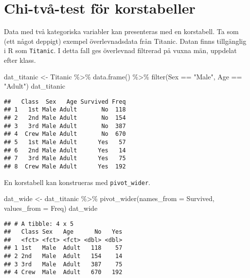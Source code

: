 \documentclass[
]{book}
\newenvironment{Shaded}{\begin{snugshade}}{\end{snugshade}}
\newcommand{\AttributeTok}[1]{\textcolor[rgb]{0.77,0.63,0.00}{#1}}
\newcommand{\FunctionTok}[1]{\textcolor[rgb]{0.00,0.00,0.00}{#1}}
\newcommand{\NormalTok}[1]{#1}
\newcommand{\OtherTok}[1]{\textcolor[rgb]{0.56,0.35,0.01}{#1}}
\newcommand{\SpecialCharTok}[1]{\textcolor[rgb]{0.00,0.00,0.00}{#1}}
\newcommand{\StringTok}[1]{\textcolor[rgb]{0.31,0.60,0.02}{#1}}
\theoremstyle{definition}
\theoremstyle{definition}
\theoremstyle{definition}
\theoremstyle{definition}
\theoremstyle{remark}
\begin{document}
\hypertarget{chi-tvuxe5-test-fuxf6r-korstabeller}{%
\section{Chi-två-test för korstabeller}\label{chi-tvuxe5-test-fuxf6r-korstabeller}}

Data med två kategoriska variabler kan presenteras med en korstabell. Ta som (ett något deppigt) exempel överlevnadsdata från Titanic. Datan finns tillgänglig i R som \texttt{Titanic}. I detta fall ges överlevnad filtrerad på vuxna män, uppdelat efter klass.

\begin{Shaded}
\begin{Highlighting}[]
\NormalTok{dat\_titanic }\OtherTok{\textless{}{-}}\NormalTok{ Titanic }\SpecialCharTok{\%\textgreater{}\%} \FunctionTok{data.frame}\NormalTok{() }\SpecialCharTok{\%\textgreater{}\%} \FunctionTok{filter}\NormalTok{(Sex }\SpecialCharTok{==} \StringTok{"Male"}\NormalTok{, Age }\SpecialCharTok{==} \StringTok{"Adult"}\NormalTok{)}
\NormalTok{dat\_titanic}
\end{Highlighting}
\end{Shaded}

\begin{verbatim}
##   Class  Sex   Age Survived Freq
## 1   1st Male Adult       No  118
## 2   2nd Male Adult       No  154
## 3   3rd Male Adult       No  387
## 4  Crew Male Adult       No  670
## 5   1st Male Adult      Yes   57
## 6   2nd Male Adult      Yes   14
## 7   3rd Male Adult      Yes   75
## 8  Crew Male Adult      Yes  192
\end{verbatim}

En korstabell kan konstrueras med \texttt{pivot\_wider}.

\begin{Shaded}
\begin{Highlighting}[]
\NormalTok{dat\_wide }\OtherTok{\textless{}{-}}\NormalTok{ dat\_titanic }\SpecialCharTok{\%\textgreater{}\%} 
  \FunctionTok{pivot\_wider}\NormalTok{(}\AttributeTok{names\_from =}\NormalTok{ Survived, }\AttributeTok{values\_from =}\NormalTok{ Freq)}
\NormalTok{dat\_wide}
\end{Highlighting}
\end{Shaded}

\begin{verbatim}
## # A tibble: 4 x 5
##   Class Sex   Age      No   Yes
##   <fct> <fct> <fct> <dbl> <dbl>
## 1 1st   Male  Adult   118    57
## 2 2nd   Male  Adult   154    14
## 3 3rd   Male  Adult   387    75
## 4 Crew  Male  Adult   670   192
\end{verbatim}
\end{document}
